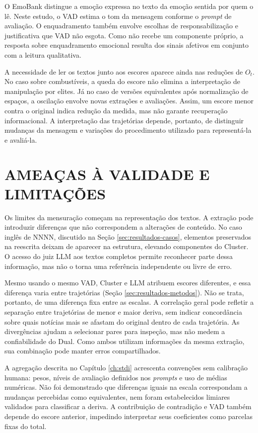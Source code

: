 O EmoBank \cite{buechel2017emobank} distingue a emoção expressa no texto da emoção sentida por quem o lê. Neste estudo, o VAD estima o tom da mensagem conforme o \textit{prompt} de avaliação. O enquadramento também envolve escolhas de responsabilização e justificativa que VAD não esgota. Como  não recebe um componente próprio, a resposta sobre enquadramento emocional resulta dos sinais afetivos em conjunto com a leitura qualitativa.

A necessidade de ler os textos junto aos escores aparece ainda nas reduções de $O_t$. No caso sobre combustíveis, a queda do escore não elimina a interpretação de manipulação por elites. Já no caso de versões equivalentes após normalização de espaços, a oscilação envolve novas extrações e avaliações. Assim, um escore menor contra o original indica redução da medida, mas não garante recuperação informacional. A interpretação das trajetórias depende, portanto, de distinguir mudanças da mensagem e variações do procedimento utilizado para representá-la e avaliá-la.

\section{AMEAÇAS À VALIDADE E LIMITAÇÕES}
\label{sec:discussao-validade}

Os limites da mensuração começam na representação dos textos. A extração pode introduzir diferenças que não correspondem a alterações de conteúdo. No caso inglês de NNNN, discutido na Seção \ref{sec:resultados-casos}, elementos preservados na reescrita deixam de aparecer na estrutura, elevando componentes do Cluster. O acesso do juiz LLM aos textos completos permite reconhecer parte dessa informação, mas não o torna uma referência independente ou livre de erro.

Mesmo usando o mesmo VAD, Cluster e LLM atribuem escores diferentes, e essa diferença varia entre trajetórias (Seção \ref{sec:resultados-metodos}). Não se trata, portanto, de uma diferença fixa entre as escalas. A correlação geral pode refletir a separação entre trajetórias de menor e maior deriva, sem indicar concordância sobre quais notícias mais se afastam do original dentro de cada trajetória. As divergências ajudam a selecionar pares para inspeção, mas não medem a confiabilidade do Dual. Como ambos utilizam informações da mesma extração, sua combinação pode manter erros compartilhados.

A agregação descrita no Capítulo \ref{ch:stdi} acrescenta convenções sem calibração humana: pesos, níveis de avaliação definidos nos \textit{prompts} e uso de médias numéricas. Não foi demonstrado que diferenças iguais na escala correspondam a mudanças percebidas como equivalentes, nem foram estabelecidos limiares validados para classificar a deriva. A contribuição de contradição e VAD também depende do escore anterior, impedindo interpretar seus coeficientes como parcelas fixas do total.

